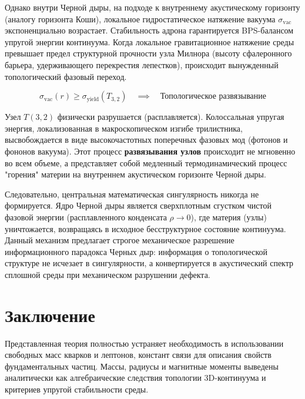 \documentclass[12pt,a4paper]{article}
\begin{document}
	Однако внутри Черной дыры, на подходе к внутреннему акустическому горизонту (аналогу горизонта Коши), локальное гидростатическое натяжение вакуума $\sigma_{\text{vac}}$ экспоненциально возрастает. Стабильность адрона гарантируется BPS-балансом упругой энергии континуума. Когда локальное гравитационное натяжение среды превышает предел структурной прочности узла Милнора (высоту сфалеронного барьера, удерживающего перекрестия лепестков), происходит вынужденный топологический фазовый переход.
	
	\begin{equation}
		\sigma_{\text{vac}}(r) \ge \sigma_{\text{yield}}(T_{3,2}) \quad \implies \quad \text{Топологическое развязывание}
	\end{equation}
	
	Узел $T(3,2)$ физически разрушается (расплавляется). Колоссальная упругая энергия, локализованная в макроскопическом изгибе трилистника, высвобождается в виде высокочастотных поперечных фазовых мод (фотонов и фононов вакуума). 
	Этот процесс \textbf{развязывания узлов} происходит не мгновенно во всем объеме, а представляет собой медленный термодинамический процесс "горения" материи на внутреннем акустическом горизонте Черной дыры. 
	
	Следовательно, центральная математическая сингулярность никогда не формируется. Ядро Черной дыры является сверхплотным сгустком чистой фазовой энергии (расплавленного конденсата $\rho \to 0$), где материя (узлы) уничтожается, возвращаясь в исходное бесструктурное состояние континуума. Данный механизм предлагает строгое механическое разрешение информационного парадокса Черных дыр: информация о топологической структуре не исчезает в сингулярности, а конвертируется в акустический спектр сплошной среды при механическом разрушении дефекта.
	
	\section*{Заключение}
	Представленная теория полностью устраняет необходимость в использовании свободных масс кварков и лептонов, констант связи для описания свойств фундаментальных частиц. Массы, радиусы и магнитные моменты выведены аналитически как алгебраические следствия топологии 3D-континуума и критериев упругой стабильности среды.
	
\end{document}
